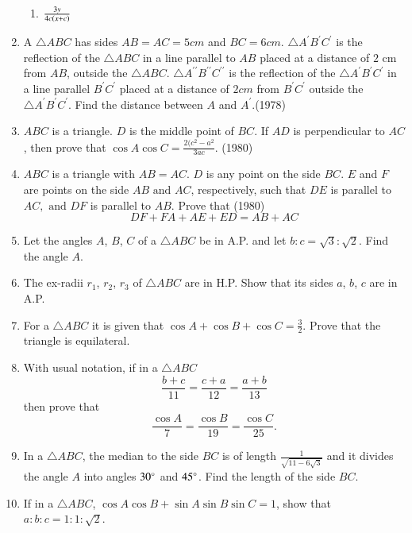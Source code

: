 \begin{enumerate}[label=\thesubsection.\arabic*,ref=\thesubsection.\theenumi]
\begin{multicols}{2}
\begin{enumerate}
\item $\frac{3y}{4c\left(x+c\right)}$
\end{enumerate}
\end{multicols}
     \item A $\triangle ABC$ has sides $AB=AC=5 cm$ and $BC =6 cm$. $\triangle A^{\prime}B^{\prime}C^{\prime}$ is the reflection of the $\triangle ABC$ in a line parallel to $AB$ placed at a distance of $2$ cm from $AB$, outside the $\triangle ABC$. $\triangle A^{\prime\prime}B^{\prime\prime}C^{\prime\prime}$ is the reflection of the $\triangle A^{\prime}B^{\prime}C^{\prime}$ in a line parallel $B^{\prime}C^{\prime}$ placed at a distance of $2 cm$ from $B^{\prime}C^{\prime}$ outside the $\triangle A^{\prime}B^{\prime}C^{\prime}$. Find the distance between ${A}$ and ${A^{\prime}}$.\hfill {(1978)}
     \item $ABC$ is a triangle. ${D}$ is the middle point of $BC$. If $AD$ is perpendicular to $AC$, then prove that $\cos{A}\cos{C} = \frac{2(c^{2}-a^{2}}{3ac}$.
     \hfill {(1980)}
     \item $ABC$ is a triangle with $AB=AC$. ${D}$ is any point on the side $BC$. ${E}$ and ${F}$ are points on the side $AB \text{ and } AC$, respectively, such that $DE$ is parallel to $AC, \text{ and } DF$ is parallel to $AB$. Prove that 
     \hfill {(1980)} 
     $$DF + FA + AE + ED = AB+AC$$
%
\item Let the angles $A$, $B$, $C$ of a $\triangle ABC$ be in A.P. and let $b:c=\sqrt{3}:\sqrt{2}$. Find the angle $A$. 
%
\hfill{}
%
\item The ex-radii $r_1$, $r_2$, $r_3$ of $\triangle ABC$ are in H.P. Show that its sides $a$, $b$, $c$ are in A.P.
%

\hfill{} 
%
\item For a $\triangle ABC$ it is given that $\cos{A}+\cos{B}+\cos{C}=\frac{3}{2}$. Prove that the triangle is equilateral. 
%
\hfill{}
%
\item With usual notation, if in a $\triangle ABC$ $$\frac{b+c}{11}=\frac{c+a}{12}=\frac{a+b}{13}$$ then prove that $$\frac{\cos{A}}{7}=\frac{\cos{B}}{19}=\frac{\cos{C}}{25}.$$ 
%
\hfill{}
%
%
\item In a $\triangle ABC$, the median to the side $BC$ is of length $\frac{1}{\sqrt{11-6\sqrt{3}}}$ and it divides the angle $A$ into angles $30\degree$ and $45\degree$. Find the length of the side $BC$.
%
\hfill{}
%
\item If in a $\triangle ABC$, $\cos{A}\cos{B}+\sin{A}\sin{B}\sin{C}=1$, show that $a:b:c=1:1:\sqrt{2}$.
%


\end{enumerate}
